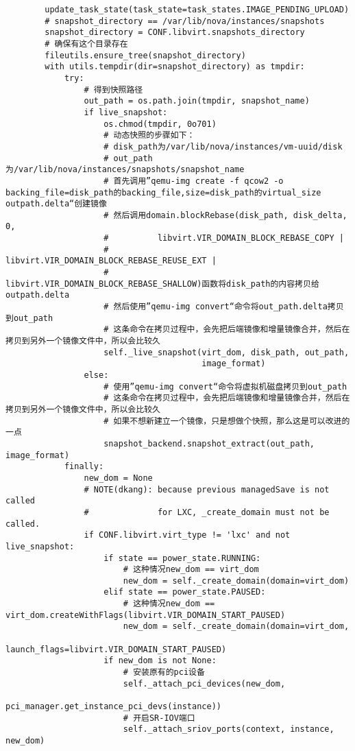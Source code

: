 \documentclass[a4paper,left=1.5cm,right=1.5cm,11pt]{article}
\begin{document}
\begin{lstlisting}
        update_task_state(task_state=task_states.IMAGE_PENDING_UPLOAD)
        # snapshot_directory == /var/lib/nova/instances/snapshots
        snapshot_directory = CONF.libvirt.snapshots_directory
        # 确保有这个目录存在
        fileutils.ensure_tree(snapshot_directory)
        with utils.tempdir(dir=snapshot_directory) as tmpdir:
            try:
                # 得到快照路径
                out_path = os.path.join(tmpdir, snapshot_name)
                if live_snapshot:
                    os.chmod(tmpdir, 0o701)
                    # 动态快照的步骤如下：
                    # disk_path为/var/lib/nova/instances/vm-uuid/disk
                    # out_path为/var/lib/nova/instances/snapshots/snapshot_name
                    # 首先调用”qemu-img create -f qcow2 -o backing_file=disk_path的backing_file,size=disk_path的virtual_size outpath.delta“创建镜像
                    # 然后调用domain.blockRebase(disk_path, disk_delta, 0,
                    #          libvirt.VIR_DOMAIN_BLOCK_REBASE_COPY |
                    #          libvirt.VIR_DOMAIN_BLOCK_REBASE_REUSE_EXT |
                    #          libvirt.VIR_DOMAIN_BLOCK_REBASE_SHALLOW)函数将disk_path的内容拷贝给outpath.delta
                    # 然后使用”qemu-img convert“命令将out_path.delta拷贝到out_path
                    # 这条命令在拷贝过程中，会先把后端镜像和增量镜像合并，然后在拷贝到另外一个镜像文件中，所以会比较久
                    self._live_snapshot(virt_dom, disk_path, out_path,
                                        image_format)
                else:
                    # 使用”qemu-img convert“命令将虚拟机磁盘拷贝到out_path
                    # 这条命令在拷贝过程中，会先把后端镜像和增量镜像合并，然后在拷贝到另外一个镜像文件中，所以会比较久
                    # 如果不想新建立一个镜像，只是想做个快照，那么这是可以改进的一点
                    snapshot_backend.snapshot_extract(out_path, image_format)
            finally:
                new_dom = None
                # NOTE(dkang): because previous managedSave is not called
                #              for LXC, _create_domain must not be called.
                if CONF.libvirt.virt_type != 'lxc' and not live_snapshot:
                    if state == power_state.RUNNING:
                        # 这种情况new_dom == virt_dom
                        new_dom = self._create_domain(domain=virt_dom)
                    elif state == power_state.PAUSED:
                        # 这种情况new_dom == virt_dom.createWithFlags(libvirt.VIR_DOMAIN_START_PAUSED)
                        new_dom = self._create_domain(domain=virt_dom,
                                launch_flags=libvirt.VIR_DOMAIN_START_PAUSED)
                    if new_dom is not None:
                        # 安装原有的pci设备
                        self._attach_pci_devices(new_dom,
                            pci_manager.get_instance_pci_devs(instance))
                        # 开启SR-IOV端口
                        self._attach_sriov_ports(context, instance, new_dom)


\end{lstlisting}
\end{document}
